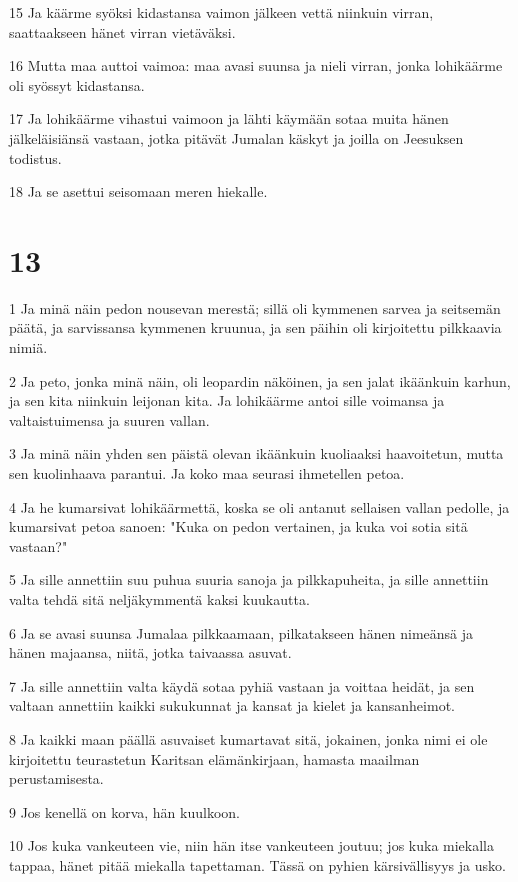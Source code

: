 \par 15 Ja käärme syöksi kidastansa vaimon jälkeen vettä niinkuin virran, saattaakseen hänet virran vietäväksi.
\par 16 Mutta maa auttoi vaimoa: maa avasi suunsa ja nieli virran, jonka lohikäärme oli syössyt kidastansa.
\par 17 Ja lohikäärme vihastui vaimoon ja lähti käymään sotaa muita hänen jälkeläisiänsä vastaan, jotka pitävät Jumalan käskyt ja joilla on Jeesuksen todistus.
\par 18 Ja se asettui seisomaan meren hiekalle.

\chapter{13}

\par 1 Ja minä näin pedon nousevan merestä; sillä oli kymmenen sarvea ja seitsemän päätä, ja sarvissansa kymmenen kruunua, ja sen päihin oli kirjoitettu pilkkaavia nimiä.
\par 2 Ja peto, jonka minä näin, oli leopardin näköinen, ja sen jalat ikäänkuin karhun, ja sen kita niinkuin leijonan kita. Ja lohikäärme antoi sille voimansa ja valtaistuimensa ja suuren vallan.
\par 3 Ja minä näin yhden sen päistä olevan ikäänkuin kuoliaaksi haavoitetun, mutta sen kuolinhaava parantui. Ja koko maa seurasi ihmetellen petoa.
\par 4 Ja he kumarsivat lohikäärmettä, koska se oli antanut sellaisen vallan pedolle, ja kumarsivat petoa sanoen: "Kuka on pedon vertainen, ja kuka voi sotia sitä vastaan?"
\par 5 Ja sille annettiin suu puhua suuria sanoja ja pilkkapuheita, ja sille annettiin valta tehdä sitä neljäkymmentä kaksi kuukautta.
\par 6 Ja se avasi suunsa Jumalaa pilkkaamaan, pilkatakseen hänen nimeänsä ja hänen majaansa, niitä, jotka taivaassa asuvat.
\par 7 Ja sille annettiin valta käydä sotaa pyhiä vastaan ja voittaa heidät, ja sen valtaan annettiin kaikki sukukunnat ja kansat ja kielet ja kansanheimot.
\par 8 Ja kaikki maan päällä asuvaiset kumartavat sitä, jokainen, jonka nimi ei ole kirjoitettu teurastetun Karitsan elämänkirjaan, hamasta maailman perustamisesta.
\par 9 Jos kenellä on korva, hän kuulkoon.
\par 10 Jos kuka vankeuteen vie, niin hän itse vankeuteen joutuu; jos kuka miekalla tappaa, hänet pitää miekalla tapettaman. Tässä on pyhien kärsivällisyys ja usko.
